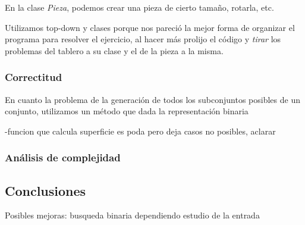 \quad En la clase \textit{Pieza}, podemos crear una pieza de cierto tama\~no, rotarla, etc.

\quad Utilizamos top-down y clases porque nos pareci\'o la mejor forma de organizar el programa para resolver el ejercicio, al hacer m\'as prolijo el c\'odigo y \textit{tirar} los problemas del tablero a su clase y el de la pieza a la misma.

\subsubsection{Correctitud}

\quad En cuanto la problema de la generaci\'on de todos los subconjuntos posibles de un conjunto, utilizamos un m\'etodo que dada la representaci\'on binaria

-funcion que calcula superficie es poda  pero deja casos no posibles, aclarar

\subsubsection{An\'alisis de complejidad}



\subsection{Conclusiones}

\quad Posibles mejoras: busqueda binaria dependiendo estudio de la entrada